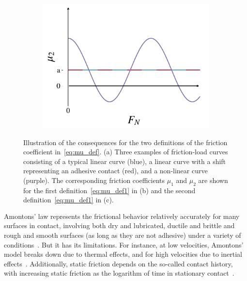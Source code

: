 \begin{figure}[H]
\begin{subfigure}[t]{0.32\textwidth}
      \caption{}
      \label{fig:fric_coef_example_b}
    \end{subfigure}
    \hfill
    \begin{subfigure}[t]{0.32\textwidth}
      \centering
      \includegraphics[width=\textwidth]{figures/theory/fric_coef_example_c.pdf}
      \caption{}
      \label{fig:fric_coef_example_c}
  \end{subfigure}
  \hfill
  \caption{Illustration of the consequences for the two definitions of the friction coefficient in~\cref{eq:mu_def}. (a) Three examples of friction-load curves consisting of a typical linear curve (blue), a linear curve with a shift representing an adhesive contact (red), and a non-linear curve (purple). The corresponding friction coefficients $\mu_1$ and $\mu_2$ are shown for the first definition~\cref{eq:mu_def1} in (b) and the second definition~\cref{eq:mu_def1} in (c).}
  \label{fig:fric_coef_example}
\end{figure}


Amontons’ law represents the frictional behavior relatively accurately for many surfaces in contact, involving both dry and lubricated, ductile and brittle and rough and smooth surfaces (as long as they are not adhesive) under a variety of conditions~\cite{gao_frictional_2004}. But it has its limitations. For instance, at low velocities, Amontons' model breaks down due to thermal effects, and for high velocities due to inertial effects~\cite[pp.\ 5--6]{gnecco_meyer_2015}. Additionally, static friction depends on the so-called contact history, with increasing static friction as the logarithm of time in stationary contact~\cite{dieterich_1972}.

